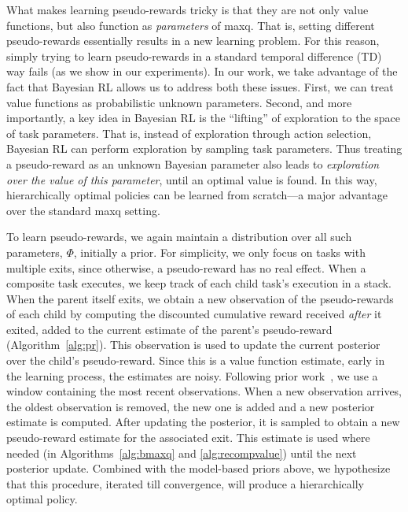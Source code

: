 What makes learning pseudo-rewards tricky is that they are not
only value functions, but also function as {\em parameters} of 
{\sc maxq}. That is, setting different pseudo-rewards
essentially results in a new learning problem. For this reason,
simply trying to learn pseudo-rewards 
in a standard temporal difference (TD) way fails (as we show in our experiments).  In our
work, we take advantage of the fact that Bayesian RL allows us to
address both these issues.  First, we can treat value functions as
probabilistic unknown parameters. Second, and more importantly, a key
idea in Bayesian RL is the ``lifting'' of exploration to the space of
task parameters. That is, instead of exploration through action
selection, Bayesian RL can perform exploration by sampling task
parameters. Thus treating a pseudo-reward as an unknown Bayesian
parameter also leads to {\em exploration over the value of this
  parameter}, until an optimal value is found. In this way, hierarchically optimal policies can be learned from scratch---a major advantage over
the standard {\sc maxq} setting.

To learn pseudo-rewards, we again maintain a distribution over all
such parameters, $\Phi$, initially a prior. For simplicity, we only
focus on tasks with multiple exits, since otherwise, a pseudo-reward
has no real effect. When a composite task executes, we keep track of
each child task's execution in a stack. When the parent itself exits,
we obtain a new observation of the pseudo-rewards of each child by
computing the discounted cumulative reward received {\em after} it
exited, added to the current estimate of the parent's pseudo-reward
(Algorithm~\ref{alg:pr}). This observation is used to update the
current posterior over the child's pseudo-reward. Since this is a
value function estimate, early in the learning process, the estimates
are noisy. Following prior work~\cite{Dearden98}, we
use a window containing the most recent observations. When a new
observation arrives, the oldest observation is removed, the new one is
added and a new posterior estimate is computed. After updating the
posterior, it is sampled to obtain a new pseudo-reward estimate for
the associated exit. This estimate is used where needed (in
Algorithms~\ref{alg:bmaxq} and \ref{alg:recompvalue}) until the next
posterior update. Combined with the model-based priors above, we
hypothesize that this procedure, iterated till
convergence, will produce a hierarchically optimal policy.
